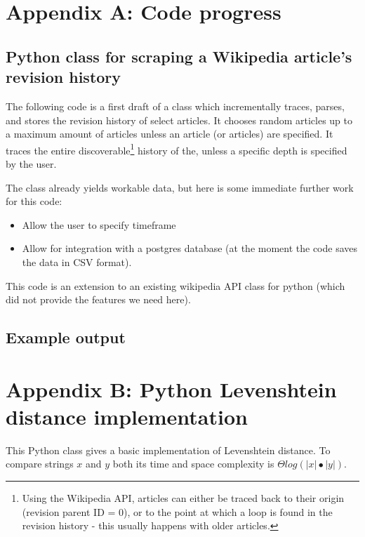 \documentclass[a4paper,11pt,twoside,notitlepage]{article}
\begin{document}
        
        \clearpage
        \begin{appendices}
          \section{Appendix A: Code progress}
          \subsection{Python class for scraping a Wikipedia article's
            revision history}
          \label{wiki-scrape}
          The following code is a first draft of a class which incrementally
          traces, parses, and stores the revision history of select articles. It
          chooses random articles up to a maximum amount of articles unless an
          article (or articles) are specified. It traces the entire
          discoverable\footnote{Using the Wikipedia API, articles can either be
            traced back to their origin (revision parent ID = 0), or to the
            point at which a loop is found in the revision history - this
            usually happens with older articles.} history of the, unless a
          specific depth is specified by the user.
          
          The class already yields workable data, but here is some immediate
          further work for this code:
          \begin{itemize}
          \item Allow the user to specify timeframe
          \item Allow for integration with a postgres database (at the moment
            the code saves the data in CSV format).
          \end{itemize}
          
          This code is an extension to an existing wikipedia API class for
          python (which did not provide the features we need
          here).\cite{python-wikipedia}
          
          
          \subsection{Example output}
          
          \clearpage
          \section{Appendix B: Python Levenshtein distance implementation}
          \label{levenshtein-implement}
          This Python class gives a basic implementation of
          Levenshtein distance. To compare strings $x$ and $y$ both
          its time and space complexity is
          ${\Theta}log(|x|{\bullet}|y|)$.


\end{appendices}
\end{document}

